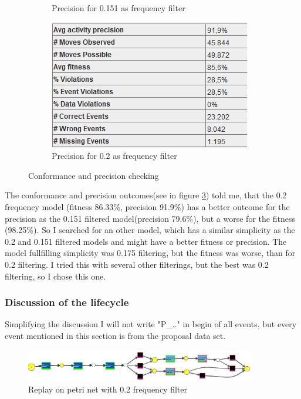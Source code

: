 \begin{figure}[!htbp]
\begin{subfigure}{.4\textwidth}
  \caption{Precision for 0.151 as frequency filter}
  \label{fig:P_Prec0-151}
\end{subfigure}%
\begin{subfigure}{.4\textwidth}
  \centering
  \includegraphics[width=\linewidth]{P_Precision0-2.PNG}
  \caption{Precision for 0.2 as frequency filter}
  \label{fig:P_Prec0-2}
\end{subfigure}
\caption{Conformance and precision checking}
\label{fig:P_ConfPrec}
\end{figure}


The conformance and precision outcomes(see in figure \ref{fig:P_ConfPrec}) told me, that the 0.2 frequency model (fitness 86.33\%, precision 91.9\%) has a better outcome for the precision as the 0.151 filtered model(precision 79.6\%), but a worse for the fitness (98.25\%). So I searched for an other model, which has a similar simplicity as the 0.2 and 0.151 filtered models and might have a better fitness or precision. The model fullfilling simplicity was 0.175 filtering, but the fitness was worse, than for 0.2 filtering. I tried this with several other filterings, but the best was 0.2 filtering, so I chose this one.


\subsubsection{Discussion of the lifecycle}
Simplifying the discussion I will not write "P\_.." in begin of all events, but every event mentioned in this section is from the proposal data set.

\begin{figure}[!htbp]
  \begin{center}
    \includegraphics[width = 0.9\textwidth]{P_ConfomGraph0-2.png}
  \end{center}
  \caption{Replay on petri net with 0.2 frequency filter}
\end{figure}

